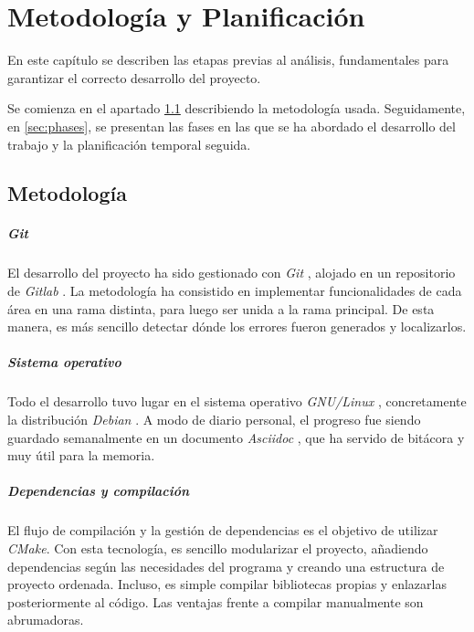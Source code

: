 \chapter{Metodología y Planificación}\label{chp:methodology}

En este capítulo se describen las etapas previas al análisis, fundamentales para garantizar el  correcto desarrollo del proyecto.

Se comienza en el apartado \ref{sec:method} describiendo la metodología usada. Seguidamente, en \ref{sec:phases}, se presentan las fases en las que se ha abordado el desarrollo del trabajo y la planificación temporal seguida.

\section{Metodología}\label{sec:method}

\paragraph{Git} El desarrollo del proyecto ha sido gestionado con \textit{Git} \cite{webGit}, alojado en un repositorio\cite{webGitlabRenderer} de \textit{Gitlab} \cite{webGitlab}. La metodología ha consistido en implementar funcionalidades de cada área en una rama distinta, para luego ser unida a la rama principal. De esta manera, es más sencillo detectar dónde los errores fueron generados y localizarlos.

\paragraph{Sistema operativo} Todo el desarrollo tuvo lugar en el sistema operativo \textit{GNU/Linux} \cite{webGNULinux}, concretamente la distribución \textit{Debian} \cite{webDebian}. A modo de diario personal, el progreso fue siendo guardado semanalmente en un documento \textit{Asciidoc} \cite{webAsciidoc}, que ha servido de bitácora y muy útil para la memoria.

\paragraph{Dependencias y compilación} El flujo de compilación y la gestión de dependencias es el objetivo de utilizar \textit{CMake}. Con esta tecnología, es sencillo modularizar el proyecto, añadiendo dependencias según las necesidades del programa y creando una estructura de proyecto ordenada. Incluso, es simple compilar bibliotecas propias y enlazarlas posteriormente al código. Las ventajas frente a compilar manualmente son abrumadoras.

